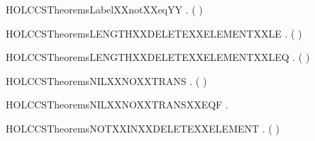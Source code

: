 \begin{SaveVerbatim}{HOLCCSTheoremsLabelXXnotXXeqYY}
\HOLTokenTurnstile{} \HOLSymConst{\HOLTokenForall{}} . (  \HOLSymConst{=}  ) \HOLSymConst{\HOLTokenEquiv{}} 
\end{SaveVerbatim}
\newcommand{\HOLCCSTheoremsLabelXXnotXXeqYY}{\UseVerbatim{HOLCCSTheoremsLabelXXnotXXeqYY}}
\begin{SaveVerbatim}{HOLCCSTheoremsLENGTHXXDELETEXXELEMENTXXLE}
\HOLTokenTurnstile{} \HOLSymConst{\HOLTokenForall{}} .    \HOLSymConst{\HOLTokenImp{}}  (  ) \HOLSymConst{\HOLTokenLt{}}  
\end{SaveVerbatim}
\newcommand{\HOLCCSTheoremsLENGTHXXDELETEXXELEMENTXXLE}{\UseVerbatim{HOLCCSTheoremsLENGTHXXDELETEXXELEMENTXXLE}}
\begin{SaveVerbatim}{HOLCCSTheoremsLENGTHXXDELETEXXELEMENTXXLEQ}
\HOLTokenTurnstile{} \HOLSymConst{\HOLTokenForall{}} .  (  ) \HOLSymConst{\HOLTokenLeq{}}  
\end{SaveVerbatim}
\newcommand{\HOLCCSTheoremsLENGTHXXDELETEXXELEMENTXXLEQ}{\UseVerbatim{HOLCCSTheoremsLENGTHXXDELETEXXELEMENTXXLEQ}}
\begin{SaveVerbatim}{HOLCCSTheoremsNILXXNOXXTRANS}
\HOLTokenTurnstile{} \HOLSymConst{\HOLTokenForall{}} . \HOLSymConst{\HOLTokenNeg{}}( \HOLTokenTransBegin{}\HOLTokenTransEnd {})
\end{SaveVerbatim}
\newcommand{\HOLCCSTheoremsNILXXNOXXTRANS}{\UseVerbatim{HOLCCSTheoremsNILXXNOXXTRANS}}
\begin{SaveVerbatim}{HOLCCSTheoremsNILXXNOXXTRANSXXEQF}
\HOLTokenTurnstile{} \HOLSymConst{\HOLTokenForall{}} .  \HOLTokenTransBegin{}\HOLTokenTransEnd {} \HOLSymConst{\HOLTokenEquiv{}} 
\end{SaveVerbatim}
\newcommand{\HOLCCSTheoremsNILXXNOXXTRANSXXEQF}{\UseVerbatim{HOLCCSTheoremsNILXXNOXXTRANSXXEQF}}
\begin{SaveVerbatim}{HOLCCSTheoremsNOTXXINXXDELETEXXELEMENT}
\HOLTokenTurnstile{} \HOLSymConst{\HOLTokenForall{}} . \HOLSymConst{\HOLTokenNeg{}}  (  )
\end{SaveVerbatim}
